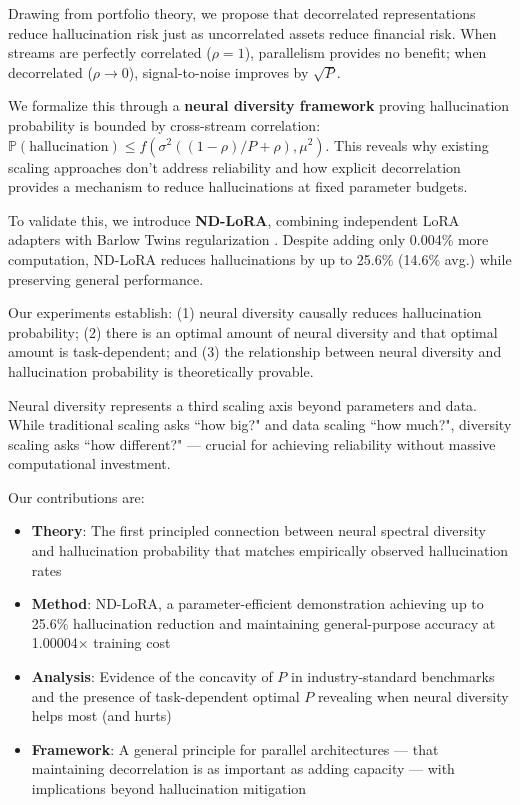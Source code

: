 \documentclass{article} %
\begin{document}
Drawing from portfolio theory, we propose that decorrelated representations reduce hallucination risk just as
uncorrelated assets reduce financial risk. When streams are perfectly correlated ($\rho=1$), parallelism provides
no benefit; when decorrelated ($\rho \to 0$), signal-to-noise improves by $\sqrt{P}$.

We formalize this through a \textbf{neural diversity framework} proving hallucination probability is bounded by
cross-stream correlation: $\mathbb{P}(\text{hallucination}) \leq f(\sigma^2((1-\rho)/P + \rho), \mu^2)$. This
reveals why existing scaling approaches don't address reliability and how explicit decorrelation provides a
mechanism to reduce hallucinations at fixed parameter budgets.

To validate this, we introduce \textbf{ND-LoRA}, combining independent LoRA adapters with Barlow Twins
regularization \citep{zbontar2021barlow}. Despite adding only 0.004\% more computation, ND-LoRA reduces
hallucinations by up to 25.6\% (14.6\% avg.) while preserving general performance.

Our experiments establish: (1) neural diversity causally reduces hallucination probability; (2) there is an
optimal amount of neural diversity and that optimal amount is task-dependent; and (3) the relationship
between neural diversity and hallucination probability is theoretically provable.

Neural diversity represents a third scaling axis beyond parameters and data. While traditional scaling asks
``how big?" and data scaling ``how much?", diversity scaling asks ``how different?" --- crucial for achieving
reliability without massive computational investment.

Our contributions are:
\begin{itemize}
  \item \textbf{Theory}: The first principled connection between neural spectral diversity and hallucination
    probability that matches empirically observed hallucination rates
  \item \textbf{Method}: ND-LoRA, a parameter-efficient demonstration achieving up to 25.6\% hallucination reduction
    and maintaining general-purpose accuracy at 1.00004$\times$ training cost
  \item \textbf{Analysis}: Evidence of the concavity of $P$ in industry-standard benchmarks and the presence
    of task-dependent optimal $P$ revealing when neural diversity helps most (and hurts)
  \item \textbf{Framework}: A general principle for parallel architectures --- that maintaining decorrelation is as
    important as adding capacity --- with implications beyond hallucination mitigation
\end{itemize}
\end{document}
